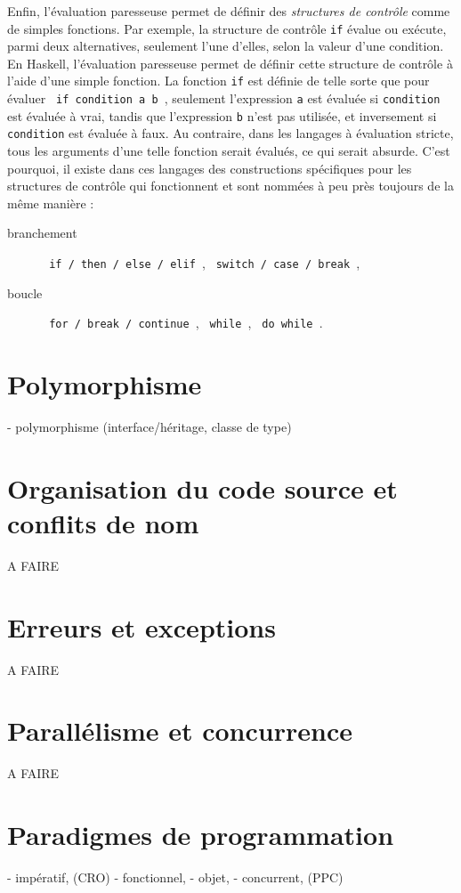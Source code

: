 \documentclass[a4paper,francais]{insalyon}
\begin{document}
Enfin, l'évaluation paresseuse permet de définir des \emph{structures de contrôle} comme de simples fonctions. Par exemple, la structure de contrôle \texttt{if} évalue ou exécute, parmi deux alternatives, seulement l'une d'elles, selon la valeur d'une condition. En Haskell, l'évaluation paresseuse permet de définir cette structure de contrôle à l'aide d'une simple fonction. La fonction \texttt{if} est définie de telle sorte que pour évaluer \verb! if condition a b !, seulement l'expression \texttt{a} est évaluée si \texttt{condition} est évaluée à vrai, tandis que l'expression \texttt{b} n'est pas utilisée, et inversement si \texttt{condition} est évaluée à faux. Au contraire, dans les langages à évaluation stricte, tous les arguments d'une telle fonction serait évalués, ce qui serait absurde. C'est pourquoi, il existe dans ces langages des constructions spécifiques pour les structures de contrôle qui fonctionnent et sont nommées à peu près toujours de la même manière :
\begin{description}
\item[branchement] \verb! if / then / else / elif !, \verb! switch / case / break !, 
\item[boucle] \verb! for / break / continue !, \verb! while !, \verb! do while !.
\end{description}

\section{Polymorphisme}

- polymorphisme (interface/héritage, classe de type)

\section{Organisation du code source et conflits de nom}

A FAIRE

\section{Erreurs et exceptions}

A FAIRE

\section{Parallélisme et concurrence}

A FAIRE

\section{Paradigmes de programmation}

- impératif, (CRO)
- fonctionnel, 
- objet, 
- concurrent, (PPC)



\end{document}

